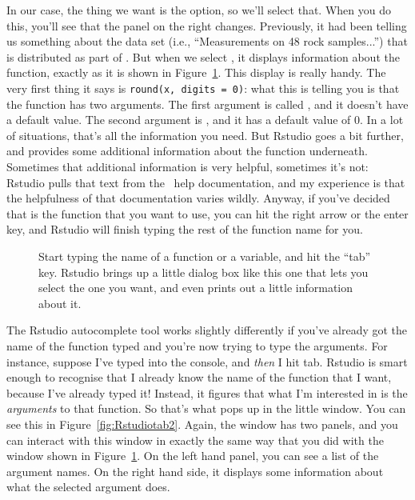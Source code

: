 In our case, the thing we want is the  option, so we'll select that. When you do this, you'll see that the panel on the right changes. Previously, it had been telling us something about the  data set (i.e., ``Measurements on 48 rock samples...'') that is distributed as part of \R. But when we select , it displays information about the  function, exactly as it is shown in Figure~\ref{fig:Rstudiotab}. This display is really handy. The very first thing it says is \texttt{round(x, digits = 0)}: what this is telling you is that the  function has two arguments. The first argument is called , and it doesn't have a default value. The second argument is , and it has a default value of 0. In a lot of situations, that's all the information you need. But Rstudio goes a bit further, and provides some additional information about the function underneath. Sometimes that additional information is very helpful, sometimes it's not: Rstudio pulls that text from the \R\ help documentation, and my experience is that the helpfulness of that documentation varies wildly. Anyway, if you've decided that  is the function that you want to use, you can hit the right arrow or the enter key, and Rstudio will finish typing the rest of the function name for you. 

\begin{figure}[t]
\begin{center}
\caption{Start typing the name of a function or a variable, and hit the ``tab'' key. Rstudio brings up a little dialog box like this one that lets you select the one you want, and even prints out a little information about it.}
\HR
\label{fig:Rstudiotab}
\end{center}
\end{figure}

The Rstudio autocomplete tool works slightly differently if you've already got the name of the function typed and you're now trying to type the arguments. For instance, suppose I've typed  into the console, and {\it then} I hit tab. Rstudio is smart enough to recognise that I already know the name of the function that I want, because I've already typed it! Instead, it figures that what I'm interested in is the {\it arguments} to that function. So that's what pops up in the little window. You can see this in Figure~\ref{fig:Rstudiotab2}. Again, the window has two panels, and you can interact with this window in exactly the same way that you did with the window shown in Figure~\ref{fig:Rstudiotab}. On the left hand panel, you can see a list of the argument names. On the right hand side, it displays some information about what the selected argument does. 



